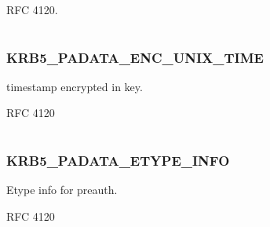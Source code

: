 \documentclass[letterpaper,10pt,english]{sphinxmanual}
\begin{document}
RFC 4120.

\begin{tabulary}{\linewidth}{|L|L|}
\hline

 & 
\\
\hline\end{tabulary}



\subsubsection{KRB5\_PADATA\_ENC\_UNIX\_TIME}
\label{appdev/refs/macros/KRB5_PADATA_ENC_UNIX_TIME:krb5-padata-enc-unix-time}\label{appdev/refs/macros/KRB5_PADATA_ENC_UNIX_TIME:krb5-padata-enc-unix-time-data}\label{appdev/refs/macros/KRB5_PADATA_ENC_UNIX_TIME::doc}

\begin{fulllineitems}
\label{appdev/refs/macros/KRB5_PADATA_ENC_UNIX_TIME:KRB5_PADATA_ENC_UNIX_TIME}
\end{fulllineitems}


timestamp encrypted in key.

RFC 4120

\begin{tabulary}{\linewidth}{|L|L|}
\hline

 & 
\\
\hline\end{tabulary}



\subsubsection{KRB5\_PADATA\_ETYPE\_INFO}
\label{appdev/refs/macros/KRB5_PADATA_ETYPE_INFO::doc}\label{appdev/refs/macros/KRB5_PADATA_ETYPE_INFO:krb5-padata-etype-info}\label{appdev/refs/macros/KRB5_PADATA_ETYPE_INFO:krb5-padata-etype-info-data}

\begin{fulllineitems}
\label{appdev/refs/macros/KRB5_PADATA_ETYPE_INFO:KRB5_PADATA_ETYPE_INFO}
\end{fulllineitems}


Etype info for preauth.

RFC 4120
\end{document}
